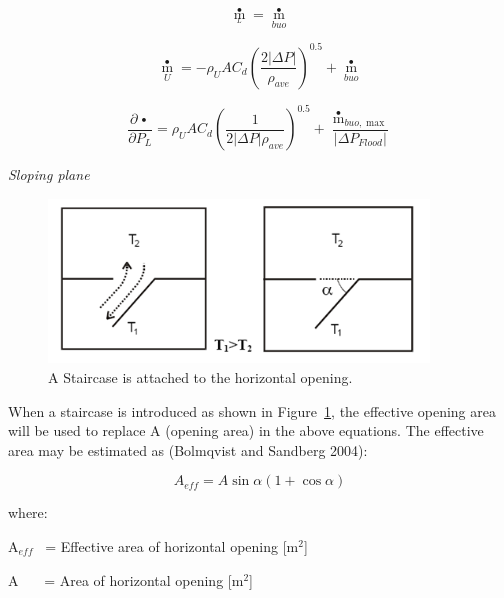 \begin{equation}
{\mathop m\limits^ \bullet_{_L}} = {\mathop m\limits^ \bullet_{buo}}
\end{equation}

\begin{equation}
{\mathop m\limits^ \bullet_U} =  - {\rho_U}A{C_d}{\left( {\frac{{2\left| {\Delta P} \right|}}{{{\rho_{ave}}}}} \right)^{0.5}} + {\mathop m\limits^ \bullet_{buo}}
\end{equation}

\begin{equation}
\frac{{\partial \mathop {{m_U}}\limits^ \bullet  }}{{\partial {P_L}}} = {\rho_U}A{C_d}{\left( {\frac{1}{{2\left| {\Delta P} \right|{\rho_{ave}}}}} \right)^{0.5}} + \frac{{{{\mathop m\limits^ \bullet  }_{buo,\max }}}}{{\left| {\Delta {P_{Flood}}} \right|}}
\end{equation}

\emph{Sloping plane}

\begin{figure}[hbtp] %
\centering
\includegraphics[width=0.9\textwidth, height=0.9\textheight, keepaspectratio=true]{media/image2741.png}
\caption{A Staircase is attached to the horizontal opening. \protect \label{fig:a-staircase-is-attached-to-the-horizontal}}
\end{figure}

When a staircase is introduced as shown in Figure~\ref{fig:a-staircase-is-attached-to-the-horizontal}, the effective opening area will be used to replace A (opening area) in the above equations. The effective area may be estimated as (Bolmqvist and Sandberg 2004):

\begin{equation}
{A_{eff}} = A\sin \alpha (1 + \cos \alpha )
\end{equation}

where:

A\(_{eff}\)~ = Effective area of horizontal opening {[}m\(^{2}\){]}

A~~~ = Area of horizontal opening {[}m\(^{2}\){]}

